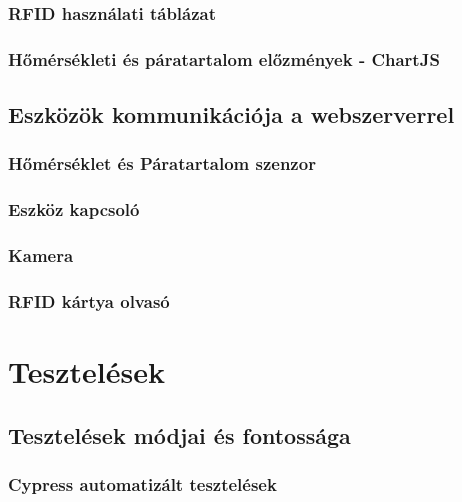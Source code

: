 \documentclass[
]{thesis-ekf}
\theoremstyle{definition}
\theoremstyle{remark}
\begin{document}
	\subsection{RFID használati táblázat}
	\subsection{Hőmérsékleti és páratartalom előzmények - ChartJS}
	\section{Eszközök kommunikációja a webszerverrel}\label{csatlakozas-a-webszerverre}
	\subsection{Hőmérséklet és Páratartalom szenzor}
	\subsection{Eszköz kapcsoló}\label{toggle}
	\subsection{Kamera}
	\subsection{RFID kártya olvasó}
	
	
	\chapter{Tesztelések}
	\section{Tesztelések módjai és fontossága}
	
	\subsection{Cypress automatizált tesztelések}
\end{document}
